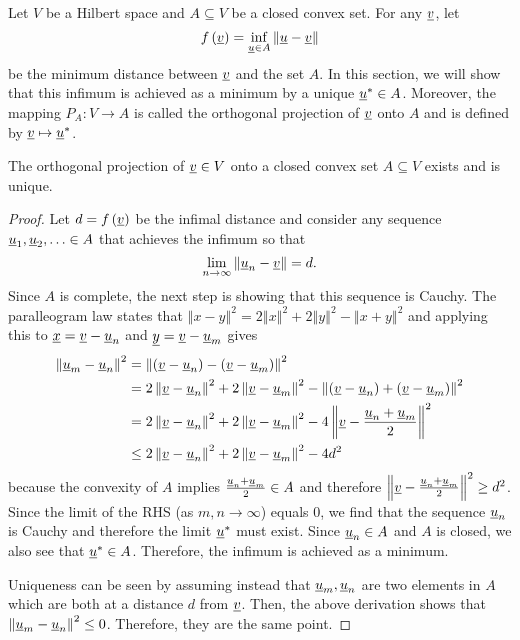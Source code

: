 Let $V$ be a Hilbert space and $A\subseteq V$ be a closed convex set. For any $\underline v$, let
\[
f\left(\underline v\right)=\inf_{\underline u\in A}\left\Vert \underline u-\underline v\right\Vert 
\]
be the minimum distance between $\underline v$ and the set $A$. In this section, we will show that this infimum is achieved as a minimum by a unique $\underline u^{*}\in A$. Moreover, the mapping $P_{A}:V\rightarrow A$ is called the orthogonal projection of $\underline v$ onto $A$ and is defined by $\underline v\mapsto\underline u^{*}$.
\begin{theorem}
\label{thm:HilbertProjectionTheorem} The orthogonal projection of $\underline v\in V$ onto a closed convex set $A\subseteq V$ exists and is unique.
\end{theorem}
\begin{proof}
Let $d=f\left(\underline v\right)$ be the infimal distance and consider any sequence $\underline u_{1},\underline u_{2},\ldots\in A$ that achieves the infimum so that
\[
\lim_{n\rightarrow\infty}\left\Vert \underline u_{n}-\underline v\right\Vert =d.
\]
Since $A$ is complete, the next step is showing that this sequence is Cauchy. The paralleogram law states that $\left\Vert x-y\right\Vert ^{2}=2\left\Vert x\right\Vert ^{2}+2\left\Vert y\right\Vert ^{2}-\left\Vert x+y\right\Vert ^{2}$ and applying this to $\underline{x}=\underline{v}-\underline u_{n}$ and $\underline{y}=\underline{v}-\underline u_{m}$ gives
\begin{align*}
\left\Vert \underline u_{m}-\underline u_{n}\right\Vert ^{2} & =\left\Vert \left(\underline v-\underline u_{n}\right)-\left(\underline v-\underline u_{m}\right)\right\Vert ^{2}\\
 & =2\left\Vert \underline v-\underline u_{n}\right\Vert ^{2}+2\left\Vert \underline v-\underline u_{m}\right\Vert ^{2}-\left\Vert \left(\underline v-\underline u_{n}\right)+\left(\underline v-\underline u_{m}\right)\right\Vert ^{2}\\
 & =2\left\Vert \underline v-\underline u_{n}\right\Vert ^{2}+2\left\Vert \underline v-\underline u_{m}\right\Vert ^{2}-4\left\Vert \underline v-\frac{\underline u_{n}+\underline u_{m}}{2}\right\Vert ^{2}\\
 & \leq2\left\Vert \underline v-\underline u_{n}\right\Vert ^{2}+2\left\Vert \underline v-\underline u_{m}\right\Vert ^{2}-4d^{2}
\end{align*}
because the convexity of $A$ implies $\frac{\underline u_{n}+\underline u_{m}}{2}\in A$ and therefore $\left\Vert \underline v-\frac{\underline u_{n}+\underline u_{m}}{2}\right\Vert ^{2}\geq d^{2}$. Since the limit of the RHS (as $m,n\rightarrow\infty$) equals $0$, we find that the sequence $\underline u_{n}$ is Cauchy and therefore the limit $\underline u^{*}$ must exist. Since $\underline u_{n}\in A$ and $A$ is closed, we also see that $\underline u^{*}\in A$. Therefore, the infimum is achieved as a minimum.

Uniqueness can be seen by assuming instead that $\underline u_{m},\underline u_{n}$ are two elements in $A$ which are both at a distance $d$ from $\underline v$. Then, the above derivation shows that $\left\Vert \underline u_{m}-\underline u_{n}\right\Vert ^{2}\leq0$. Therefore, they are the same point.
\end{proof}
